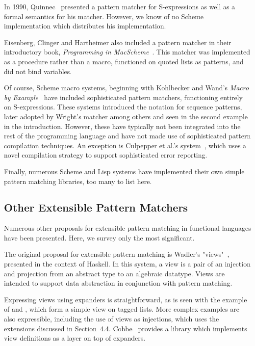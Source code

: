 \documentclass[onecolumn]{llncs}
\newcommand{\SecRefUC}[2]{Section~#1}
\newcommand{\Scribtexttt}[1]{{\texttt{#1}}}
\newcommand{\badlink}[1]{#1}
\newcommand{\SColorize}[2]{\color{#1}{#2}}
\newcommand{\inColor}[2]{{\Scribtexttt{\SColorize{#1}{#2}}}}
\newcommand{\RktSym}[1]{\inColor{IdentifierColor}{#1}}
\newcommand{\RktValLink}[1]{\inColor{blue}{#1}}
\begin{document}
In 1990, Quinnec~\cite{cq:match} presented a pattern matcher for
S{-}expressions as well as a formal semantics for his matcher.  However,
we know of no Scheme implementation which distributes his
implementation.

Eisenberg, Clinger and Hartheimer also included a pattern matcher in
their introductory book, \textit{Programming in
MacScheme}~\cite{macscheme-book}. This matcher was implemented as a
procedure rather than a macro, functioned on quoted lists as patterns,
and did not bind variables.

Of course, Scheme macro systems, beginning with Kohlbecker and Wand{'}s
\textit{Macro by Example}~\cite{kw:mbe} have included sophisticated
pattern matchers, functioning entirely on S{-}expressions.  These
systems introduced the \RktSym{\RktStxLink{{\hbox{\texttt{.}}}{\hbox{\texttt{.}}}{\hbox{\texttt{.}}}}} notation for sequence patterns,
later adopted by Wright{'}s matcher among others and seen in the second
example in the introduction.  However, these have
typically not been integrated into the rest of the programming
language and have not made use of sophisticated pattern compilation
techniques.  An exception is Culpepper et al.{'}s \RktSym{\RktStxLink{syntax{-}parse}}
system~\cite{cf:syntax-parse}, which uses a novel compilation
strategy to support sophisticated error reporting.

Finally, numerous Scheme and Lisp systems have implemented their own simple
pattern matching libraries, too many to list here.

\subsection[Other Extensible Pattern Matchers]{Other Extensible Pattern Matchers}\label{t:x28part_x22Otherx5fExtensiblex5fPatternx5fMatchersx22x29}

Numerous other proposals for extensible pattern matching in functional
languages have been presented.  Here, we survey only the most significant.

The original proposal for extensible pattern matching is Wadler{'}s
"views"~\cite{views}, presented in the context of Haskell.  In this
system, a view is a pair of an injection and projection from an
abstract type to an algebraic datatype.  Views are intended to support
data abstraction in conjunction with pattern matching.

Expressing views using \RktSym{\RktStxLink{match}} expanders is straightforward, as is seen
with the example of \RktSym{\badlink{\RktValLink{cart}}} and \RktSym{\badlink{\RktValLink{polar}}}, which form a simple view
on tagged lists.  More complex examples are also expressible,
including the use of views as injections, which uses the
extensions discussed in \SecRefUC{4.4}{Further Extensions}.  Cobbe~\cite{c:views}
provides a library which implements view definitions as a layer on
top of \RktSym{\RktStxLink{match}} expanders.
\end{document}
